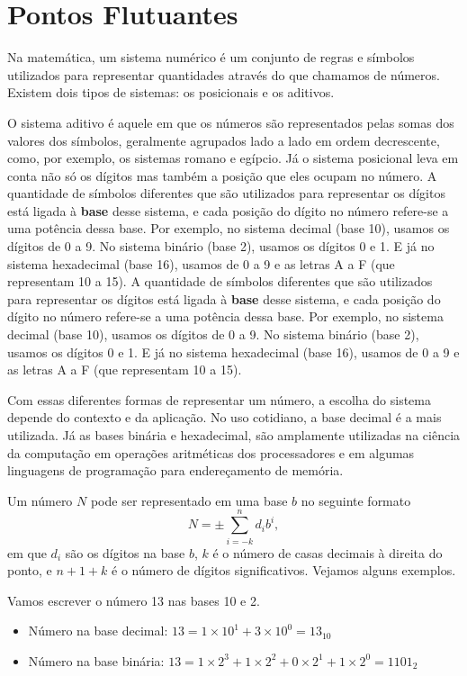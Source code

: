 \chapter{Pontos Flutuantes}


Na matemática, um sistema numérico é um conjunto de regras e símbolos utilizados para representar quantidades através do que chamamos de números. Existem dois tipos de sistemas: os posicionais e os aditivos.

O sistema aditivo é aquele em que os números são representados pelas somas dos valores dos símbolos, geralmente agrupados lado a lado em ordem decrescente, como, por exemplo, os sistemas romano e egípcio. Já o sistema posicional leva em conta não só os dígitos mas também a posição que eles ocupam no número. A quantidade de símbolos diferentes que são utilizados para representar os dígitos está ligada à \textbf{base} desse sistema, e cada posição do dígito no número refere-se a uma potência dessa base. Por exemplo, no sistema decimal (base 10), usamos os dígitos de 0 a 9. No sistema binário (base 2), usamos os dígitos 0 e 1. E já no sistema hexadecimal (base 16), usamos de 0 a 9 e as letras A a F (que representam 10 a 15).
A quantidade de símbolos diferentes que são utilizados para representar os dígitos está ligada à \textbf{base} desse sistema, e cada posição do dígito no número refere-se a uma potência dessa base. Por exemplo, no sistema decimal (base 10), usamos os dígitos de 0 a 9. No sistema binário (base 2), usamos os dígitos 0 e 1. E já no sistema hexadecimal (base 16), usamos de 0 a 9 e as letras A a F (que representam 10 a 15).

Com essas diferentes formas de representar um número, a escolha do sistema depende do contexto e da aplicação. No uso cotidiano, a base decimal é a mais utilizada. Já as bases binária e hexadecimal, são amplamente utilizadas na ciência da computação em operações aritméticas dos processadores e em algumas linguagens de programação para endereçamento de memória.

Um número $N$ pode ser representado em uma base \(b\) no seguinte formato
\begin{equation}
N = \pm \sum_{i=-k}^{n} d_i b^i,
\end{equation}
em que \(d_i\) são os dígitos na base \(b\), \(k\) é o número de casas decimais à direita do ponto, e \(n+1+k\) é o número de dígitos significativos. Vejamos alguns exemplos.

\begin{ex}
Vamos escrever o número 13 nas bases 10 e 2.
\begin{itemize}
    \item Número na base decimal: $ 13 = 1 \times 10^1 + 3 \times 10^0 = 13_{10}$
    \item Número na base binária: $ 13 = 1 \times 2^3 + 1 \times 2^2 + 0  \times 2^1 + 1 \times 2^0  = 1101_2$
\end{itemize}
\end{ex}

